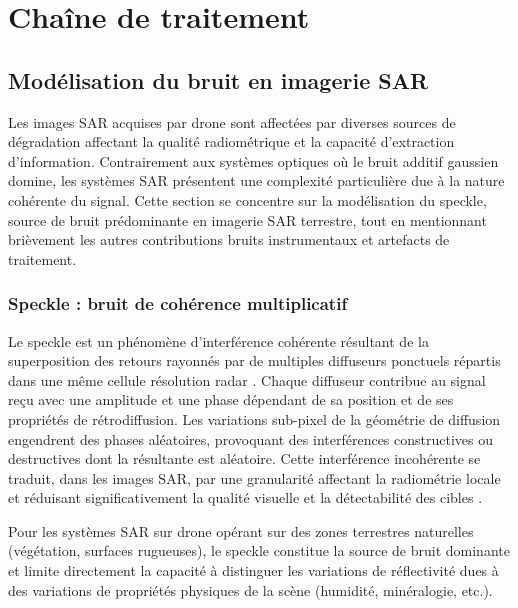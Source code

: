 \section{Chaîne de traitement}
\subsection{Modélisation du bruit en imagerie SAR}\label{subsec:modelisation_bruit}

Les images SAR acquises par drone sont affectées par diverses sources de dégradation affectant la qualité radiométrique et la capacité d'extraction d'information. Contrairement aux systèmes optiques où le bruit additif gaussien domine, les systèmes SAR présentent une complexité particulière due à la nature cohérente du signal. Cette section se concentre sur la modélisation du speckle, source de bruit prédominante en imagerie SAR terrestre, tout en mentionnant brièvement les autres contributions bruits instrumentaux et artefacts de traitement.

\subsubsection{Speckle : bruit de cohérence multiplicatif}


Le speckle est un phénomène d'interférence cohérente résultant de la superposition des retours rayonnés par de multiples diffuseurs ponctuels répartis dans une même cellule résolution radar \cite{goodman1976speckle}. Chaque diffuseur contribue au signal reçu avec une amplitude et une phase dépendant de sa position et de ses propriétés de rétrodiffusion. Les variations sub-pixel de la géométrie de diffusion engendrent des phases aléatoires, provoquant des interférences constructives ou destructives dont la résultante est aléatoire. Cette interférence incohérente se traduit, dans les images SAR, par une granularité affectant la radiométrie locale et réduisant significativement la qualité visuelle et la détectabilité des cibles \cite{lee1986speckle}.

Pour les systèmes SAR sur drone opérant sur des zones terrestres naturelles (végétation, surfaces rugueuses), le speckle constitue la source de bruit dominante et limite directement la capacité à distinguer les variations de réflectivité dues à des variations de propriétés physiques de la scène (humidité, minéralogie, etc.).

